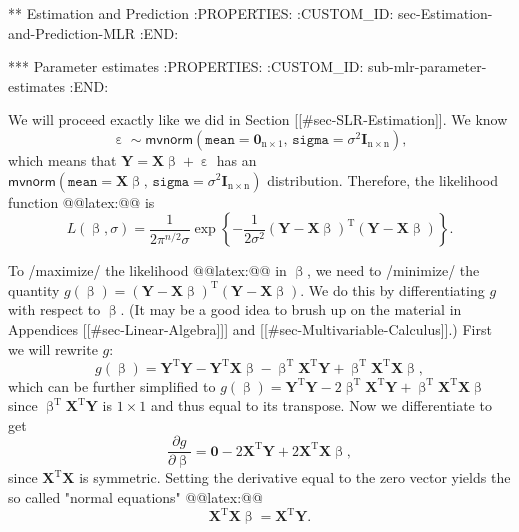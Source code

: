 ** Estimation and Prediction
:PROPERTIES:
:CUSTOM_ID: sec-Estimation-and-Prediction-MLR
:END:

*** Parameter estimates
:PROPERTIES:
:CUSTOM_ID: sub-mlr-parameter-estimates
:END:

We will proceed exactly like we did in Section [[#sec-SLR-Estimation]]. We know
\begin{equation}
\upepsilon\sim\mathsf{mvnorm}\left(\mathtt{mean}=\mathbf{0}_{\mathrm{n}\times1},\,\mathtt{sigma}=\sigma^{2}\mathbf{I}_{\mathrm{n}\times\mathrm{n}}\right),
\end{equation}
which means that \(\mathbf{Y}=\mathbf{X}\upbeta+\upepsilon\) has an \(\mathsf{mvnorm}\left(\mathtt{mean}=\mathbf{X}\upbeta,\,\mathtt{sigma}=\sigma^{2}\mathbf{I}_{\mathrm{n}\times\mathrm{n}}\right)\) distribution. Therefore, the likelihood function @@latex:@@ is
\begin{equation}
L(\upbeta,\sigma)=\frac{1}{2\pi^{n/2}\sigma}\exp\left\{ -\frac{1}{2\sigma^{2}}\left(\mathbf{Y}-\mathbf{X}\upbeta\right)^{\mathrm{T}}\left(\mathbf{Y}-\mathbf{X}\upbeta\right)\right\}.
\end{equation}

To /maximize/ the likelihood @@latex:@@ in \(\upbeta\),
we need to /minimize/ the quantity
\(g(\upbeta)=\left(\mathbf{Y}-\mathbf{X}\upbeta\right)^{\mathrm{T}}\left(\mathbf{Y}-\mathbf{X}\upbeta\right)\). We
do this by differentiating \(g\) with respect to \(\upbeta\). (It may
be a good idea to brush up on the material in Appendices [[#sec-Linear-Algebra]]] and [[#sec-Multivariable-Calculus]].) First we will rewrite \(g\):
\begin{equation}
g(\upbeta)=\mathbf{Y}^{\mathrm{T}}\mathbf{Y}-\mathbf{Y}^{\mathrm{T}}\mathbf{X}\upbeta-\upbeta^{\mathrm{T}}\mathbf{X}^{\mathrm{T}}\mathbf{Y}+\upbeta^{\mathrm{T}}\mathbf{X}^{\mathrm{T}}\mathbf{X}\upbeta,
\end{equation}
which can be further simplified to
\(g(\upbeta)=\mathbf{Y}^{\mathrm{T}}\mathbf{Y}-2\upbeta^{\mathrm{T}}\mathbf{X}^{\mathrm{T}}\mathbf{Y}+\upbeta^{\mathrm{T}}\mathbf{X}^{\mathrm{T}}\mathbf{X}\upbeta\)
since \(\upbeta^{\mathrm{T}}\mathbf{X}^{\mathrm{T}}\mathbf{Y}\) is
\(1\times1\) and thus equal to its transpose. Now we differentiate to
get
\begin{equation}
\frac{\partial g}{\partial\upbeta}=\mathbf{0}-2\mathbf{X}^{\mathrm{T}}\mathbf{Y}+2\mathbf{X}^{\mathrm{T}}\mathbf{X}\upbeta,
\end{equation}
since \(\mathbf{X}^{\mathrm{T}}\mathbf{X}\) is symmetric. Setting the
derivative equal to the zero vector yields the so called "normal
equations" @@latex:@@
\begin{equation}
\mathbf{X}^{\mathrm{T}}\mathbf{X}\upbeta=\mathbf{X}^{\mathrm{T}}\mathbf{Y}.
\end{equation}

